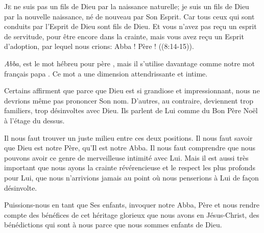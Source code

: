 \dvrule








\lettrine{J}{e} ne suis pas un fils de Dieu par la naissance naturelle;
 je suis un fils de Dieu par la nouvelle naissance, né de nouveau
 par Son Esprit.
 \Og Car tous ceux qui sont conduits par l'Esprit de Dieu sont fils de Dieu.
 Et vous n'avez pas re\c{c}u un esprit de servitude, pour être encore
 dans la crainte, mais vous avez re\c{c}u un Esprit d'adoption, par lequel
 nous crions: \Og Abba ! Père ! \Fg{} ((8:14-15)).

\emph{Abba}, est le mot hébreu pour \Og père \Fg{},
 mais il s'utilise davantage comme notre mot fran\c{c}ais \Og papa \Fg{}.
 Ce mot a une dimension attendrissante et intime.


Certains affirment que parce que Dieu est si grandiose et impressionnant,
 nous ne devrions même pas prononcer Son nom. D'autres, au contraire,
 deviennent trop familiers, trop désinvoltes avec Dieu.
 Ils parlent de Lui comme du \Og Bon Père Noël à l'étage du dessus. \Fg{}

Il nous faut trouver un juste milieu entre ces deux positions.
 Il nous faut savoir que Dieu est notre Père, qu'Il est notre Abba.
 Il nous faut comprendre que nous pouvons avoir ce genre de merveilleuse
 intimité avec Lui. Mais il est aussi très important que nous ayons
 la crainte révérencieuse et le respect les plus profonds pour Lui,
 que nous n'arrivions jamais au point où nous penserions à Lui
 de fa\c{c}on désinvolte.

Puissions-nous en tant que Ses enfants, invoquer notre Abba,
 Père et nous rendre compte des bénéfices de cet héritage glorieux
 que nous avons en Jésus-Christ, des bénédictions qui sont à nous
 parce que nous sommes enfants de Dieu. 

